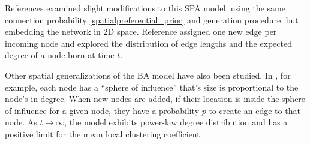 \documentclass[%
 reprint,
 amsmath,amssymb,
 aps,
]{revtex4-1}
\begin{document}
{\color{red}References \cite{SPA2, SPA3} examined slight modifications to this SPA model, using the same connection probability \ref{spatialpreferential_prior} and generation procedure, but embedding the network in 2D space. }
Reference \cite{SPA2} assigned one new edge per incoming node and explored the distribution of edge lengths and the expected degree of a node born at time $t$.



Other spatial generalizations of the BA model have also been studied. In \cite{aiello, emmanuel}, for example, each node has a ``sphere of influence'' that's size is proportional to the node's in-degree. {\color{red}When new nodes are added, if their location is inside the sphere of influence for a given node, they have a probability $p$ to create an edge to that node. As $t \rightarrow \infty$, the model exhibits power-law degree distribution and has a positive limit for the mean local clustering coefficient \cite{emmanuel}. }
\end{document}

